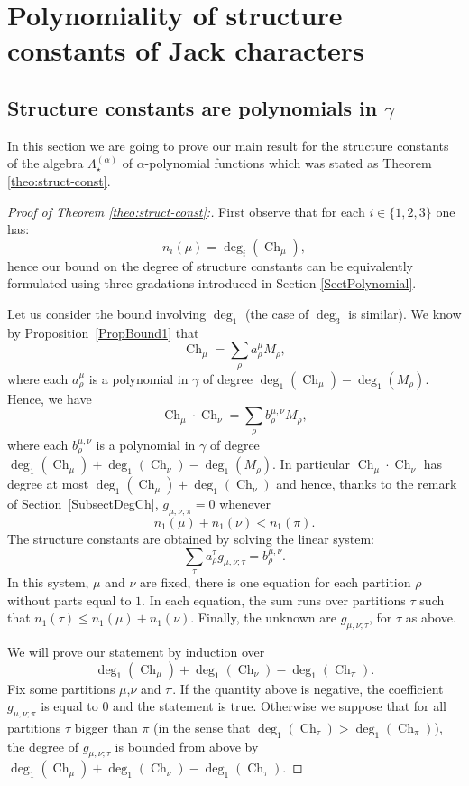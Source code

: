\documentclass[11pt]{amsart}
\theoremstyle{plain}
\theoremstyle{remark}
\newcommand{\Pola}{\Lambda_\star^{(\alpha)}}
\DeclareMathOperator{\Ch}{Ch}
\begin{document}
\section{Polynomiality of structure constants of Jack characters}
\label{SectStructureConstants}

\subsection{Structure constants are polynomials in $\gamma$}
\label{SubsectStructPol}

In this section we are going to prove our main result for the structure constants of the algebra $\Pola$ of $\alpha$-polynomial functions which was stated as Theorem \ref{theo:struct-const}.

\begin{proof}[Proof of Theorem \ref{theo:struct-const}:]
First observe that for each $i \in \{1,2,3\}$ one has:
\[ n_i(\mu) = \deg_i(\Ch_\mu),\]
hence our bound on the degree of structure constants can be equivalently formulated using three gradations introduced in Section \ref{SectPolynomial}.
    
    Let us consider the bound involving $\deg_1$ (the case of $\deg_3$ is similar).
    We know by Proposition~\ref{PropBound1} that
    \[ \Ch_\mu = \sum_\rho a_\rho^\mu M_\rho,\]
    where each $a_\rho^\mu$ is a polynomial in $\gamma$ of degree 
    $\deg_1(\Ch_\mu)-\deg_1(M_\rho)$.
    Hence, we have
    \[ \Ch_\mu \cdot \Ch_\nu = \sum_\rho b_\rho^{\mu,\nu} M_\rho,\]
    where each $b_\rho^{\mu,\nu}$ is a polynomial in $\gamma$ of degree 
        $\deg_1(\Ch_\mu)+\deg_1(\Ch_\nu)-\deg_1(M_\rho)$.
        In particular $\Ch_\mu \cdot \Ch_\nu$ has degree at most $\deg_1(\Ch_\mu)+\deg_1(\Ch_\nu)$
        and hence, thanks to the remark of Section~\ref{SubsectDegCh},
        $g_{\mu,\nu;\pi}=0$ whenever 
        \[ n_1(\mu) + n_1(\nu) < n_1(\pi).\]
    The structure constants are obtained by solving the linear system:
    \begin{equation}
        \sum_\tau a_\rho^\tau g_{\mu,\nu;\tau} = b_\rho^{\mu,\nu}.
        \tag{S}\label{EqSystStructure}
    \end{equation}
    In this system, $\mu$ and $\nu$ are fixed, there is one equation for each partition $\rho$
    without parts equal to $1$.
    In each equation, the sum runs over partitions $\tau$ such that
    $n_1(\tau) \le n_1(\mu) + n_1(\nu)$.
    Finally, the unknown are $g_{\mu,\nu;\tau}$, for $\tau$ as above.

    We will prove our statement by induction over 
    \[ \deg_1(\Ch_\mu) + \deg_1(\Ch_\nu) - \deg_1(\Ch_\pi).\]
    Fix some partitions $\mu$,$\nu$ and $\pi$.
    If the quantity above is negative, the coefficient $g_{\mu,\nu;\pi}$ is equal to $0$ and
    the statement is true.
    Otherwise we suppose that for all partitions $\tau$ bigger than
    $\pi$ (in the sense that $\deg_1(\Ch_{\tau}) > \deg_1(\Ch_{\pi})$),
    the degree of $g_{\mu,\nu;\tau}$ is bounded from above by
    $\deg_1(\Ch_\mu) + \deg_1(\Ch_\nu) - \deg_1(\Ch_\tau)$.
    

\end{proof}
\end{document}
